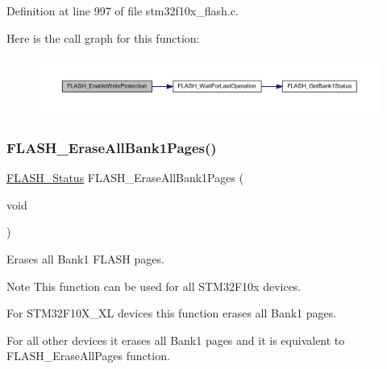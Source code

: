 Definition at line 997 of file stm32f10x\+\_\+flash.\+c.

Here is the call graph for this function\+:
\nopagebreak
\begin{figure}[H]
\begin{center}
\leavevmode
\includegraphics[width=350pt]{group___f_l_a_s_h___exported___functions_gabad10c15e2d1ff1cb9e1083d08a9e763_cgraph}
\end{center}
\end{figure}
\mbox{\label{group___f_l_a_s_h___exported___functions_ga2036728450ee18e789b25fe3fd9c80ee}} 
\subsubsection{\texorpdfstring{F\+L\+A\+S\+H\+\_\+\+Erase\+All\+Bank1\+Pages()}{FLASH\_EraseAllBank1Pages()}}
{\footnotesize\ttfamily \hyperlink{group___f_l_a_s_h___exported___types_gadc63a6f3404ff1f71229a66915e9cdc0}{F\+L\+A\+S\+H\+\_\+\+Status} F\+L\+A\+S\+H\+\_\+\+Erase\+All\+Bank1\+Pages (\begin{DoxyParamCaption}\item[{void}]{ }\end{DoxyParamCaption})}



Erases all Bank1 F\+L\+A\+SH pages. 

\begin{DoxyNote}{Note}
This function can be used for all S\+T\+M32\+F10x devices.
\begin{DoxyItemize}
\item For S\+T\+M32\+F10\+X\+\_\+\+XL devices this function erases all Bank1 pages.
\item For all other devices it erases all Bank1 pages and it is equivalent to F\+L\+A\+S\+H\+\_\+\+Erase\+All\+Pages function. 
\end{DoxyItemize}
\end{DoxyNote}

